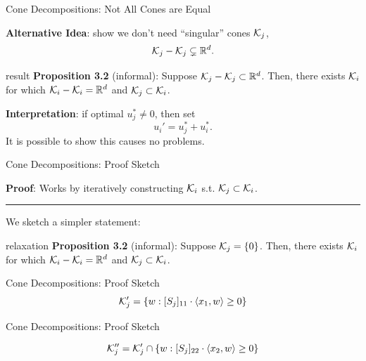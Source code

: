 \documentclass[usenames,dvipsnames,mathserif,notheorems]{beamer}
\newcommand{\horizontalrule}{
	{
			\vspace{-0.5em}
			\center \rule{\textwidth}{0.1em}
			\vspace{-0.2em}
		}
}
\begin{document}
\begin{frame}{Cone Decompositions: Not All Cones are Equal}

	\textbf{Alternative Idea}: show we don't need ``singular'' cones \( \mathcal{K}_j \),
	\[
		\mathcal{K}_j - \mathcal{K}_j \subsetneq \mathbb{R}^d.
	\]

	\vspace{1em}
	\pause

	\begin{beamercolorbox}[wd=\textwidth,sep=1em]{result}
		\textbf{Proposition 3.2} (informal): Suppose \( \mathcal{K}_j - \mathcal{K}_j \subset \mathbb{R}^d \).
		Then, there exists \( \mathcal{K}_i \) for which \( \mathcal{K}_i - \mathcal{K}_i = \mathbb{R}^d \)
		and \( \mathcal{K}_j \subset \mathcal{K}_i \).
	\end{beamercolorbox}

	\pause
	\vspace{1em}

	\textbf{Interpretation}: if optimal \( u^*_j \neq 0 \), then set
	\[
		u_i' = u_j^* + u_i^*.
	\]
	It is possible to show this causes no problems.


\end{frame}

\begin{frame}{Cone Decompositions: Proof Sketch}

	\textbf{Proof}: Works by iteratively constructing \( \mathcal{K}_i \) s.t. \( \mathcal{K}_j \subset \mathcal{K}_i \).

	\pause
	\horizontalrule

	We sketch a simpler statement:

	\vspace{1em}

	\begin{beamercolorbox}[wd=\textwidth,sep=1em]{relaxation}
		\textbf{Proposition 3.2} (informal): Suppose \( \mathcal{K}_j = \left\{0\right\} \).
		Then, there exists \( \mathcal{K}_i \) for which \( \mathcal{K}_i - \mathcal{K}_i = \mathbb{R}^d \)
		and \( \mathcal{K}_j \subset \mathcal{K}_i \).
	\end{beamercolorbox}


\end{frame}


\begin{frame}{Cone Decompositions: Proof Sketch}
	\[
		\mathcal{K}_j' = \left\{w : [S_j]_{11} \cdot \left\langle x_1, w\right\rangle \geq 0\right\}
	\]
	\begin{figure}[]
		\centering
		
	\end{figure}
\end{frame}

\begin{frame}{Cone Decompositions: Proof Sketch}

	\[
		\mathcal{K}_j'' = \mathcal{K}_j' \cap \left\{w : [S_j]_{22} \cdot \left\langle x_2, w\right\rangle \geq 0\right\}
	\]

	\begin{figure}[]
		\centering
		
	\end{figure}
\end{frame}
\end{document}
